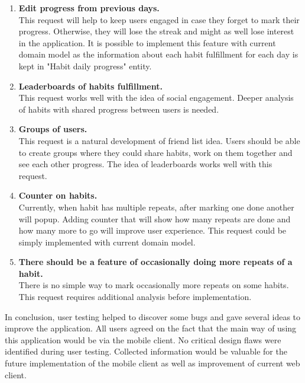 \begin{enumerate}
    \item \textbf{Edit progress from previous days.}\\
        This request will help to keep users engaged in case they forget to mark their progress.
        Otherwise, they will lose the streak and might as well lose interest in the application.
        It is possible to implement this feature with current domain model as the information about each habit fulfillment for each day is kept in "Habit daily progress" entity.
    \item \textbf{Leaderboards of habits fulfillment.}\\
        This request works well with the idea of social engagement.
        Deeper analysis of habits with shared progress between users is needed.
    \item \textbf{Groups of users.}\\
        This request is a natural development of friend list idea.
        Users should be able to create groups where they could share habits, work on them together and see each other progress.
        The idea of leaderboards works well with this request.
    \item \textbf{Counter on habits.}\\
        Currently, when habit has multiple repeats, after marking one done another will popup.
        Adding counter that will show how many repeats are done and how many more to go will improve user experience.
        This request could be simply implemented with current domain model.
    \item \textbf{There should be a feature of occasionally doing more repeats of a habit.}\\
        There is no simple way to mark occasionally more repeats on some habits.
        This request requires additional analysis before implementation.
\end{enumerate}

In conclusion, user testing helped to discover some bugs and gave several ideas to improve the application.
All users agreed on the fact that the main way of using this application would be via the mobile client.
No critical design flaws were identified during user testing.
Collected information would be valuable for the future implementation of the mobile client as well as improvement of current web client.